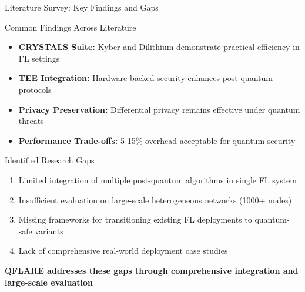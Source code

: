 \documentclass[aspectratio=169,11pt]{beamer}
\newcommand{\highlight}[1]{\textcolor{qflareblue}{\textbf{#1}}}
\begin{document}
\begin{frame}{Literature Survey: Key Findings and Gaps}

\begin{block}{Common Findings Across Literature}
\begin{itemize}
    \item \highlight{CRYSTALS Suite:} Kyber and Dilithium demonstrate practical efficiency in FL settings
    \item \highlight{TEE Integration:} Hardware-backed security enhances post-quantum protocols
    \item \highlight{Privacy Preservation:} Differential privacy remains effective under quantum threats
    \item \highlight{Performance Trade-offs:} 5-15\% overhead acceptable for quantum security
\end{itemize}
\end{block}

\begin{block}{Identified Research Gaps}
\begin{enumerate}
    \item \textcolor{qflarered}{Limited integration} of multiple post-quantum algorithms in single FL system
    \item \textcolor{qflarered}{Insufficient evaluation} on large-scale heterogeneous networks (1000+ nodes)
    \item \textcolor{qflarered}{Missing frameworks} for transitioning existing FL deployments to quantum-safe variants
    \item \textcolor{qflarered}{Lack of comprehensive} real-world deployment case studies
\end{enumerate}
\end{block}

\begin{center}
\highlight{QFLARE addresses these gaps through comprehensive integration and large-scale evaluation}
\end{center}

\end{frame}
\end{document}
